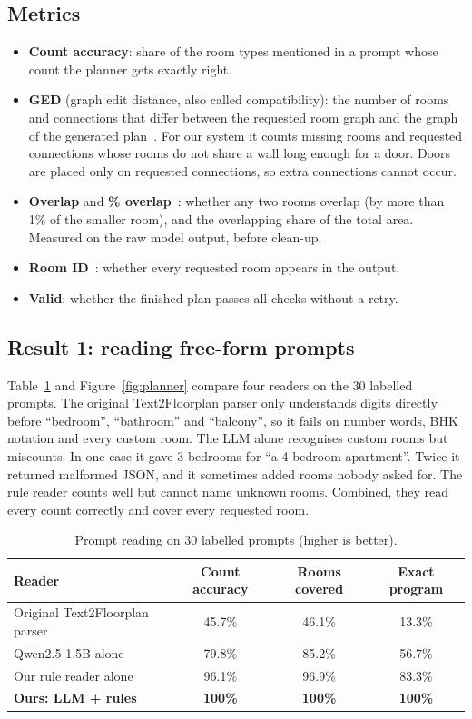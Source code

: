 \documentclass[11pt,a4paper]{article}
\begin{document}
\subsection{Metrics}
\begin{itemize}
  \item \textbf{Count accuracy}: share of the room types mentioned in a prompt
        whose count the planner gets exactly right.
  \item \textbf{GED} (graph edit distance, also called compatibility): the number
        of rooms and connections that differ between the requested room graph and
        the graph of the generated plan~\cite{housediffusion}. For our system it
        counts missing rooms and requested connections whose rooms do not share a
        wall long enough for a door. Doors are placed only on requested
        connections, so extra connections cannot occur.
  \item \textbf{Overlap} and \textbf{\% overlap}~\cite{rlvr}: whether any two
        rooms overlap (by more than 1\% of the smaller room), and the overlapping
        share of the total area. Measured on the raw model output, before
        clean-up.
  \item \textbf{Room ID}~\cite{rlvr}: whether every requested room appears in the
        output.
  \item \textbf{Valid}: whether the finished plan passes all checks without a
        retry.
\end{itemize}

\subsection{Result 1: reading free-form prompts}
Table~\ref{tab:planner} and Figure~\ref{fig:planner} compare four readers on the
30 labelled prompts. The original Text2Floorplan parser only understands digits
directly before ``bedroom'', ``bathroom'' and ``balcony'', so it fails on number
words, BHK notation and every custom room. The LLM alone recognises custom rooms
but miscounts. In one case it gave 3 bedrooms for ``a 4 bedroom apartment''.
Twice it returned malformed JSON, and it sometimes added rooms nobody asked for.
The rule reader counts well but cannot name unknown rooms. Combined, they read
every count correctly and cover every requested room.

\begin{table}[H]
\centering
\caption{Prompt reading on 30 labelled prompts (higher is better).}
\label{tab:planner}
\small
\begin{tabular}{lccc}
\toprule
\textbf{Reader} & \textbf{Count accuracy} & \textbf{Rooms covered} & \textbf{Exact program}\\
\midrule
Original Text2Floorplan parser & 45.7\% & 46.1\% & 13.3\%\\
Qwen2.5-1.5B alone             & 79.8\% & 85.2\% & 56.7\%\\
Our rule reader alone          & 96.1\% & 96.9\% & 83.3\%\\
\textbf{Ours: LLM + rules}     & \textbf{100\%} & \textbf{100\%} & \textbf{100\%}\\
\bottomrule
\end{tabular}
\end{table}
\end{document}
